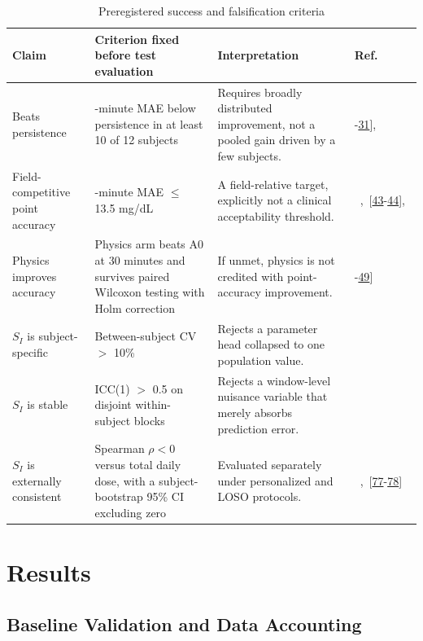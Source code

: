 \documentclass[journal]{IEEEtran}
\begin{document}
\begin{table}[t]
\centering
\caption{Preregistered success and falsification criteria}
\label{tab:falsification}
\footnotesize
\begin{tabular}{>{\raggedright\arraybackslash}p{2.6cm}>{\raggedright\arraybackslash}p{5.6cm}>{\raggedright\arraybackslash}p{5.8cm}>{\raggedright\arraybackslash}p{2.4cm}}
\toprule
Claim & Criterion fixed before test evaluation & Interpretation & Ref. \\
\midrule
Beats persistence & 30-minute MAE below persistence in at least 10 of 12 subjects & Requires broadly distributed improvement, not a pooled gain driven by a few subjects. & [\hyperref[ref30label]{30}-\hyperref[ref31label]{31}],~\cite{ref57} \\
Field-competitive point accuracy & 30-minute MAE $\leq$ 13.5 mg/dL & A field-relative target, explicitly not a clinical acceptability threshold. &~\cite{ref31},~[\hyperref[ref43label]{43}-\hyperref[ref44label]{44}],~\cite{ref64} \\
Physics improves accuracy & Physics arm beats A0 at 30 minutes and survives paired Wilcoxon testing with Holm correction & If unmet, physics is not credited with point-accuracy improvement. & [\hyperref[ref48label]{48}-\hyperref[ref49label]{49}] \\
$S_I$ is subject-specific & Between-subject CV $>$ 10\% & Rejects a parameter head collapsed to one population value. &~\cite{ref1,ref32} \\
$S_I$ is stable & ICC(1) $>$ 0.5 on disjoint within-subject blocks & Rejects a window-level nuisance variable that merely absorbs prediction error. &~\cite{ref50,ref76} \\
$S_I$ is externally consistent & Spearman $\rho < 0$ versus total daily dose, with a subject-bootstrap 95\% CI excluding zero & Evaluated separately under personalized and LOSO protocols. &~\cite{ref51},~[\hyperref[ref77label]{77}-\hyperref[ref78label]{78}] \\
\bottomrule
\end{tabular}
\end{table}


\section{Results}

\subsection{Baseline Validation and Data Accounting}
\end{document}
